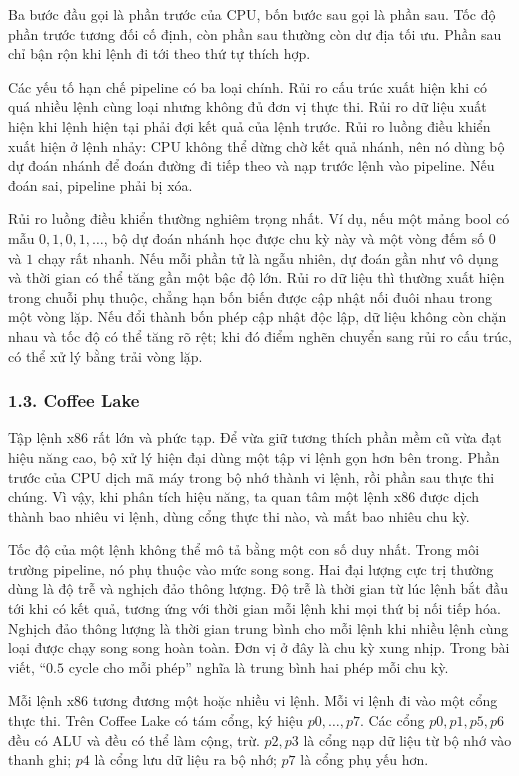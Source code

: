 \documentclass[11pt]{article}
\begin{document}
Ba bước đầu gọi là phần trước của CPU, bốn bước sau gọi là phần sau. Tốc độ
phần trước tương đối cố định, còn phần sau thường còn dư địa tối ưu. Phần sau
chỉ bận rộn khi lệnh đi tới theo thứ tự thích hợp.

Các yếu tố hạn chế pipeline có ba loại chính. Rủi ro cấu trúc xuất hiện khi có
quá nhiều lệnh cùng loại nhưng không đủ đơn vị thực thi. Rủi ro dữ liệu xuất
hiện khi lệnh hiện tại phải đợi kết quả của lệnh trước. Rủi ro luồng điều khiển
xuất hiện ở lệnh nhảy: CPU không thể dừng chờ kết quả nhánh, nên nó dùng bộ dự
đoán nhánh để đoán đường đi tiếp theo và nạp trước lệnh vào pipeline. Nếu đoán
sai, pipeline phải bị xóa.

Rủi ro luồng điều khiển thường nghiêm trọng nhất. Ví dụ, nếu một mảng bool có
mẫu \(0,1,0,1,\ldots\), bộ dự đoán nhánh học được chu kỳ này và một vòng đếm
số \(0\) và \(1\) chạy rất nhanh. Nếu mỗi phần tử là ngẫu nhiên, dự đoán gần
như vô dụng và thời gian có thể tăng gần một bậc độ lớn. Rủi ro dữ liệu thì
thường xuất hiện trong chuỗi phụ thuộc, chẳng hạn bốn biến được cập nhật nối
đuôi nhau trong một vòng lặp. Nếu đổi thành bốn phép cập nhật độc lập, dữ liệu
không còn chặn nhau và tốc độ có thể tăng rõ rệt; khi đó điểm nghẽn chuyển sang
rủi ro cấu trúc, có thể xử lý bằng trải vòng lặp.

\subsubsection*{1.3. Coffee Lake}

Tập lệnh x86 rất lớn và phức tạp. Để vừa giữ tương thích phần mềm cũ vừa đạt
hiệu năng cao, bộ xử lý hiện đại dùng một tập vi lệnh gọn hơn bên trong. Phần
trước của CPU dịch mã máy trong bộ nhớ thành vi lệnh, rồi phần sau thực thi
chúng. Vì vậy, khi phân tích hiệu năng, ta quan tâm một lệnh x86 được dịch
thành bao nhiêu vi lệnh, dùng cổng thực thi nào, và mất bao nhiêu chu kỳ.

Tốc độ của một lệnh không thể mô tả bằng một con số duy nhất. Trong môi trường
pipeline, nó phụ thuộc vào mức song song. Hai đại lượng cực trị thường dùng là
độ trễ và nghịch đảo thông lượng. Độ trễ là thời gian từ lúc lệnh bắt đầu tới
khi có kết quả, tương ứng với thời gian mỗi lệnh khi mọi thứ bị nối tiếp hóa.
Nghịch đảo thông lượng là thời gian trung bình cho mỗi lệnh khi nhiều lệnh cùng
loại được chạy song song hoàn toàn. Đơn vị ở đây là chu kỳ xung nhịp. Trong bài
viết, ``\(0.5\) cycle cho mỗi phép'' nghĩa là trung bình hai phép mỗi chu kỳ.

Mỗi lệnh x86 tương đương một hoặc nhiều vi lệnh. Mỗi vi lệnh đi vào một cổng
thực thi. Trên Coffee Lake có tám cổng, ký hiệu \(p0,\ldots,p7\). Các cổng
\(p0,p1,p5,p6\) đều có ALU và đều có thể làm cộng, trừ. \(p2,p3\) là cổng nạp
dữ liệu từ bộ nhớ vào thanh ghi; \(p4\) là cổng lưu dữ liệu ra bộ nhớ; \(p7\)
là cổng phụ yếu hơn.
\end{document}
